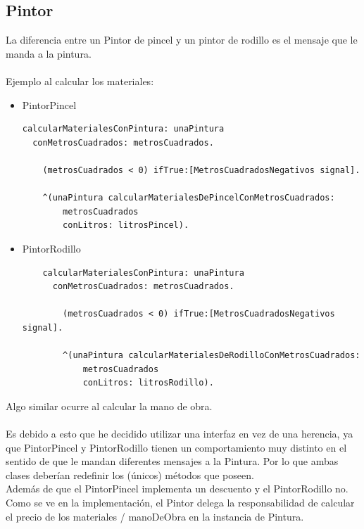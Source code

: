 \documentclass[titlepage,a4paper]{article}
\begin{document}
\subsection{Pintor}
    La diferencia entre un Pintor de pincel y un pintor de rodillo es el mensaje que le manda a la pintura.\\
    \\Ejemplo al calcular los materiales:
    \begin{itemize}
    \item PintorPincel
    \begin{verbatim}
calcularMaterialesConPintura: unaPintura
  conMetrosCuadrados: metrosCuadrados.

    (metrosCuadrados < 0) ifTrue:[MetrosCuadradosNegativos signal].
    
    ^(unaPintura calcularMaterialesDePincelConMetrosCuadrados:
        metrosCuadrados
        conLitros: litrosPincel).
    \end{verbatim}
    
    \item{PintorRodillo}
    \begin{verbatim}
    calcularMaterialesConPintura: unaPintura
      conMetrosCuadrados: metrosCuadrados.
	    
	    (metrosCuadrados < 0) ifTrue:[MetrosCuadradosNegativos signal].
	    
	    ^(unaPintura calcularMaterialesDeRodilloConMetrosCuadrados:
	        metrosCuadrados
	        conLitros: litrosRodillo).
    \end{verbatim}
\end{itemize}
Algo similar ocurre al calcular la mano de obra.\\\\
Es debido a esto que he decidido utilizar una interfaz en vez de una herencia, ya que PintorPincel y PintorRodillo tienen un comportamiento muy distinto en el sentido de que le mandan diferentes mensajes a la Pintura. Por lo que ambas clases deberían redefinir los (únicos) métodos que poseen.\\
Además de que el PintorPincel implementa un descuento y el PintorRodillo no.\\
Como se ve en la implementación, el Pintor delega la responsabilidad de calcular el precio de los materiales / manoDeObra en la instancia de Pintura.
\end{document}
